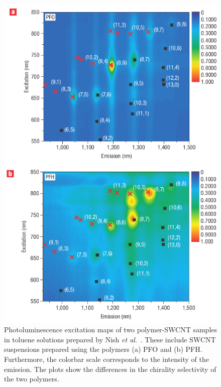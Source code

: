 \begin{figure}[H]
	\centering
	\includegraphics[scale=2.3]{images/chapter_methods/pl_nish_3}
	\caption{Photoluminescence excitation maps of two polymer-SWCNT samples in toluene solutions prepared by Nish \textit{et al}.\ \cite{nish2007highly}. These include SWCNT suspensions prepared using the polymers (a) PFO and (b) PFH. Furthermore, the colorbar scale corresponds to the intensity of the emission. The plots show the differences in the chirality selectivity of the two polymers.
	}
	\label{fig:map_nish}
\end{figure}





